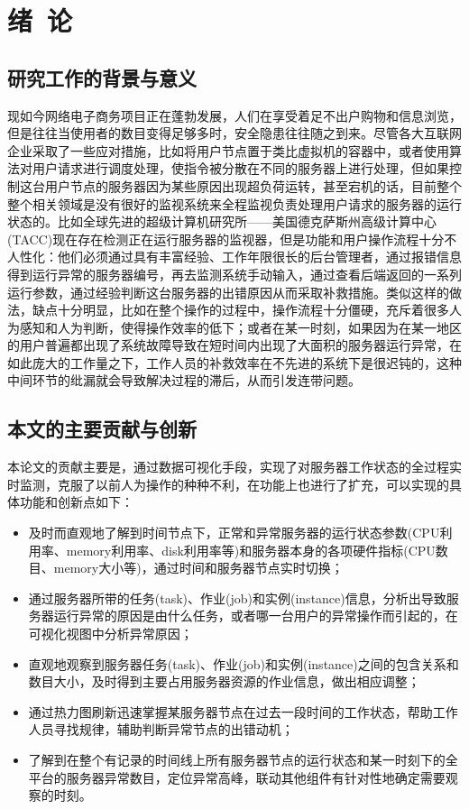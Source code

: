 \setcounter{page}{1}
\chapter{绪\ 论}
\section{研究工作的背景与意义}
现如今网络电子商务项目正在蓬勃发展，人们在享受着足不出户购物和信息浏览，但是往往当使用者的数目变得足够多时，安全隐患往往随之到来。尽管各大互联网企业采取了一些应对措施，比如将用户节点置于类比虚拟机的容器中，或者使用算法对用户请求进行调度处理，使指令被分散在不同的服务器上进行处理，但如果控制这台用户节点的服务器因为某些原因出现超负荷运转，甚至宕机的话，目前整个整个相关领域是没有很好的监视系统来全程监视负责处理用户请求的服务器的运行状态的。比如全球先进的超级计算机研究所——美国德克萨斯州高级计算中心(TACC)现在存在检测正在运行服务器的监视器，但是功能和用户操作流程十分不人性化：他们必须通过具有丰富经验、工作年限很长的后台管理者，通过报错信息得到运行异常的服务器编号，再去监测系统手动输入，通过查看后端返回的一系列运行参数，通过经验判断这台服务器的出错原因从而采取补救措施。类似这样的做法，缺点十分明显，比如在整个操作的过程中，操作流程十分僵硬，充斥着很多人为感知和人为判断，使得操作效率的低下；或者在某一时刻，如果因为在某一地区的用户普遍都出现了系统故障导致在短时间内出现了大面积的服务器运行异常，在如此庞大的工作量之下，工作人员的补救效率在不先进的系统下是很迟钝的，这种中间环节的纰漏就会导致解决过程的滞后，从而引发连带问题。
\section{本文的主要贡献与创新}
本论文的贡献主要是，通过数据可视化手段，实现了对服务器工作状态的全过程实时监测，克服了以前人为操作的种种不利，在功能上也进行了扩充，可以实现的具体功能和创新点如下：
\begin{itemize}
	\item 及时而直观地了解到时间节点下，正常和异常服务器的运行状态参数(CPU利用率、memory利用率、disk利用率等)和服务器本身的各项硬件指标(CPU数目、memory大小等)，通过时间和服务器节点实时切换；
	
	\item 通过服务器所带的任务(task)、作业(job)和实例(instance)信息，分析出导致服务器运行异常的原因是由什么任务，或者哪一台用户的异常操作而引起的，在可视化视图中分析异常原因；
	
	\item 直观地观察到服务器任务(task)、作业(job)和实例(instance)之间的包含关系和数目大小，及时得到主要占用服务器资源的作业信息，做出相应调整；
	
	\item 通过热力图刷新迅速掌握某服务器节点在过去一段时间的工作状态，帮助工作人员寻找规律，辅助判断异常节点的出错动机；
	
	\item 了解到在整个有记录的时间线上所有服务器节点的运行状态和某一时刻下的全平台的服务器异常数目，定位异常高峰，联动其他组件有针对性地确定需要观察的时刻。

\end{itemize}
	
